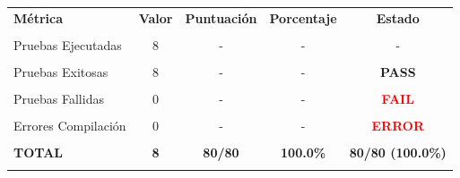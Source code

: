 \documentclass[11pt]{article}
\begin{document}
\begin{table}[h!]
\centering
\begin{tabular}{l|c|c|c|c}
\hline
\rowcolor{lightgray}
\textbf{Métrica} & \textbf{Valor} & \textbf{Puntuación} & \textbf{Porcentaje} & \textbf{Estado} \\\\
\hline
Pruebas Ejecutadas & 8 & - & - & - \\\\
Pruebas Exitosas & 8 & - & - & \textcolor{commentgreen}{\textbf{PASS}} \\\\
Pruebas Fallidas & 0 & - & - & \textcolor{red}{\textbf{FAIL}} \\\\
Errores Compilación & 0 & - & - & \textcolor{red}{\textbf{ERROR}} \\\\
\hline
\rowcolor{lightgray}
\textbf{TOTAL} & \textbf{8} & \textbf{80/80} & \textbf{100.0\%} & \textcolor{commentgreen}{\textbf{80/80 (100.0\%)}} \\\\
\hline
\end{tabular}
\end{table}
\end{document}
